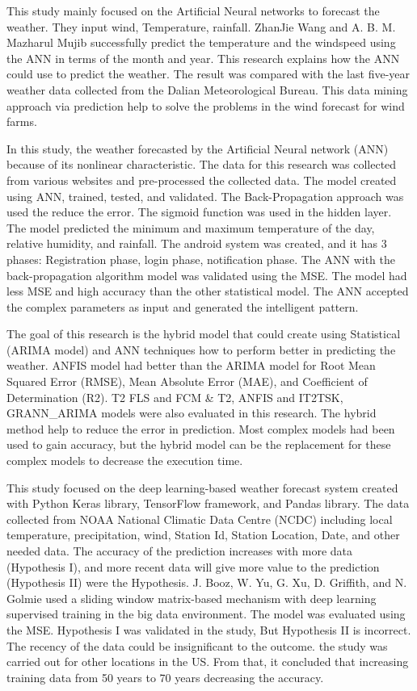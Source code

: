 \documentclass[conference]{IEEEtran}
\begin{document}
This study \cite{ ZhanJie}  mainly focused on the Artificial Neural networks to forecast the weather. They \cite{ ZhanJie}  input wind, Temperature, rainfall. ZhanJie Wang and A. B. M. Mazharul Mujib successfully predict the temperature and the windspeed using the ANN in terms of the month and year. This research \cite{ ZhanJie}  explains how the ANN could use to predict the weather.  The result was compared with the last five-year weather data collected from the Dalian Meteorological Bureau. This data mining approach via prediction help to solve the problems in the wind forecast for wind farms.

In this study, \cite{Priyanka}  the weather forecasted by the Artificial Neural network (ANN) because of its nonlinear characteristic. The data for this research \cite{Priyanka} was collected from various websites and pre-processed the collected data. The model created using ANN, trained, tested, and validated. The Back-Propagation approach was used the reduce the error. The sigmoid function was used in the hidden layer. The model predicted the minimum and maximum temperature of the day, relative humidity, and rainfall. The android system was created, and it has 3 phases: Registration phase, login phase, notification phase. The ANN with the back-propagation algorithm model was validated using the MSE. The model had less MSE and high accuracy than the other statistical model. The ANN accepted the complex parameters as input and generated the intelligent pattern.

The goal of this research \cite{6136289} is the hybrid model that could create using Statistical (ARIMA model) and ANN techniques how to perform better in predicting the weather. ANFIS model had better than the ARIMA model for Root Mean Squared Error (RMSE), Mean Absolute Error (MAE), and Coefficient of Determination (R2). T2 FLS and FCM \& T2, ANFIS and IT2TSK, GRANN\_ARIMA models were also evaluated in this research. The hybrid method help to reduce the error in prediction. Most complex models had been used to gain accuracy, but the hybrid model can be the replacement for these complex models to decrease the execution time.


This study \cite{8685584} focused on the deep learning-based weather forecast system created with Python Keras library, TensorFlow framework, and Pandas library. The data collected from NOAA National Climatic Data Centre (NCDC) including local temperature, precipitation, wind, Station Id, Station Location, Date, and other needed data.  The accuracy of the prediction increases with more data (Hypothesis I), and more recent data will give more value to the prediction (Hypothesis II) were the Hypothesis. J. Booz, W. Yu, G. Xu, D. Griffith, and N. Golmie used a sliding window matrix-based mechanism with deep learning supervised training in the big data environment. The model was evaluated using the MSE. Hypothesis I was validated in the study, But Hypothesis II is incorrect. The recency of the data could be insignificant to the outcome. the study \cite{8685584} was carried out for other locations in the US. From that, it \cite{8685584} concluded that increasing training data from 50 years to 70 years decreasing the accuracy.
\end{document}
